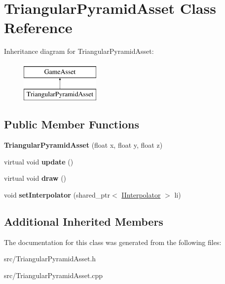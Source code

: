 \hypertarget{classTriangularPyramidAsset}{\section{Triangular\-Pyramid\-Asset Class Reference}
\label{classTriangularPyramidAsset}
}
Inheritance diagram for Triangular\-Pyramid\-Asset\-:\begin{figure}[H]
\begin{center}
\leavevmode
\includegraphics[height=2.000000cm]{classTriangularPyramidAsset}
\end{center}
\end{figure}
\subsection*{Public Member Functions}
\begin{DoxyCompactItemize}
\item 
\hypertarget{classTriangularPyramidAsset_a16069bd2b6fd057fb1a9a5dff1742989}{{\bfseries Triangular\-Pyramid\-Asset} (float x, float y, float z)}\label{classTriangularPyramidAsset_a16069bd2b6fd057fb1a9a5dff1742989}

\item 
\hypertarget{classTriangularPyramidAsset_a9fcab20720ad22e5e50139332b3f0190}{virtual void {\bfseries update} ()}\label{classTriangularPyramidAsset_a9fcab20720ad22e5e50139332b3f0190}

\item 
\hypertarget{classTriangularPyramidAsset_a9a6c04fc73cbfc2c01477907f3033a17}{virtual void {\bfseries draw} ()}\label{classTriangularPyramidAsset_a9a6c04fc73cbfc2c01477907f3033a17}

\item 
\hypertarget{classTriangularPyramidAsset_a0bd9699607ea85bfde40e793ba34e142}{void {\bfseries set\-Interpolator} (shared\-\_\-ptr$<$ \hyperlink{classIInterpolator}{I\-Interpolator} $>$ li)}\label{classTriangularPyramidAsset_a0bd9699607ea85bfde40e793ba34e142}

\end{DoxyCompactItemize}
\subsection*{Additional Inherited Members}


The documentation for this class was generated from the following files\-:\begin{DoxyCompactItemize}
\item 
src/Triangular\-Pyramid\-Asset.\-h\item 
src/Triangular\-Pyramid\-Asset.\-cpp\end{DoxyCompactItemize}
